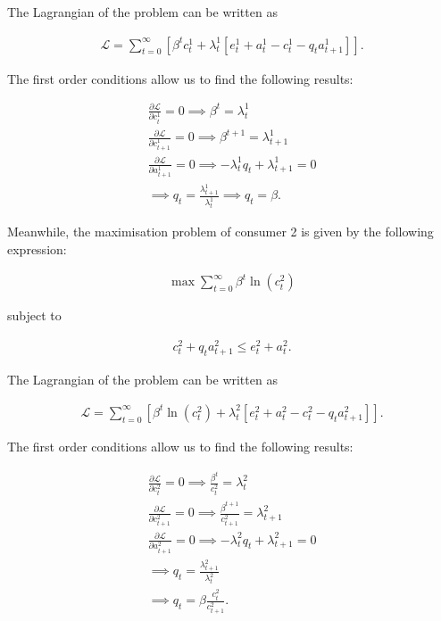 \documentclass{article}
\begin{document}
The Lagrangian of the problem can be written as

\begin{gather*}
    \mathcal{L} = \sum^\infty_{t=0} \left[ \beta^tc^1_t + \lambda_t^1[e^1_t + a^1_t - c^1_t -q_ta^1_{t+1}] \right].
\end{gather*}

The first order conditions allow us to find the following results:

\begin{gather*}
    \frac{\partial \mathcal{L}}{\partial c_t^1} = 0 \implies \beta^t = \lambda^1_t \\
    \frac{\partial \mathcal{L}}{\partial c_{t+1}^1} = 0 \implies \beta^{t+1} = \lambda^1_{t+1} \\
    \frac{\partial \mathcal{L}}{\partial a_{t+1}^1} = 0 \implies -\lambda_t^1q_t + \lambda^1_{t+1} = 0 \\
    \implies q_t = \frac{\lambda^1_{t+1}}{\lambda_t^1}  
    \implies q_t = \beta.
\end{gather*}

Meanwhile, the maximisation problem of consumer 2 is given by the following expression:

\begin{gather*}
    \max \sum^\infty_{t=0} \beta^t\ln(c^2_t) 
\end{gather*}

subject to

\begin{gather*}
    c^2_t + q_ta^2_{t+1} \leq e^2_t+a^2_t.
\end{gather*}

The Lagrangian of the problem can be written as

\begin{gather*}
    \mathcal{L} = \sum^\infty_{t=0} \left[ \beta^t\ln(c^2_t) + \lambda^2_t[e^2_t + a^2_t - c^2_t -q_ta^2_{t+1}] \right].
\end{gather*}

The first order conditions allow us to find the following results:

\begin{gather*}
    \frac{\partial \mathcal{L}}{\partial c_t^2} = 0 \implies \frac{\beta^t}{c^2_t} = \lambda^2_t \\
    \frac{\partial \mathcal{L}}{\partial c_{t+1}^2} = 0 \implies \frac{\beta^{t+1}}{c^2_{t+1}} = \lambda^2_{t+1} \\
    \frac{\partial \mathcal{L}}{\partial a_{t+1}^2} = 0 \implies -\lambda_t^2q_t + \lambda^2_{t+1} = 0 \\
    \implies q_t = \frac{\lambda^2_{t+1}}{\lambda_t^2}   \\
    \implies q_t = \beta \frac{c^2_t}{c^2_{t+1}}.
\end{gather*}
\end{document}
